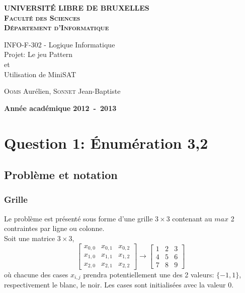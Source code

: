 \documentclass[a4paper,12pt]{report}
\begin{document}
\setlength\parindent{0pt} %


\begin{titlepage}
\begin{center}
\textbf{\textsc{UNIVERSIT\'E LIBRE DE BRUXELLES}}\\
\textbf{\textsc{Faculté des Sciences}}\\
\textbf{\textsc{Département d'Informatique}}
\vfill{}\vfill{}
\begin{center}{\Huge INFO-F-302 - Logique Informatique \\Projet: Le jeu Pattern\\ et\\ Utilisation de MiniSAT}\end{center}{\Huge \par}
\begin{center}{\large \textsc{Ooms} Aurélien, \textsc{Sonnet} Jean-Baptiste}\end{center}{\Huge \par}
\vfill{}\vfill{}
\vfill{}\vfill{}\enlargethispage{3cm}
\textbf{Année académique 2012~-~2013}
\end{center}
\end{titlepage}




\tableofcontents
\newpage


\chapter{Question 1: Énumération 3,2}

\section{Problème et notation}
\subsection{Grille}
Le problème est présenté sous forme d'une grille $3\times3$ contenant au $max$ 2 contraintes par ligne ou colonne.\\

Soit une matrice $3\times3$,  
$$\begin{bmatrix} x_{0,0} & x_{0,1} & x_{0,2} \\ x_{1,0} & x_{1,1} & x_{1,2} \\ x_{2,0} & x_{2,1} & x_{2,2}\end{bmatrix} \rightarrow \begin{bmatrix} 1 & 2 & 3 \\ 4 & 5 & 6 \\ 7 & 8 & 9\end{bmatrix}$$ 
où chacune des cases $x_{i,j}$ prendra potentiellement une des 2 valeurs: 
$\{-1,1\}$, respectivement le blanc, le noir. Les cases sont initialisées avec la valeur $0$.\\
\end{document}
